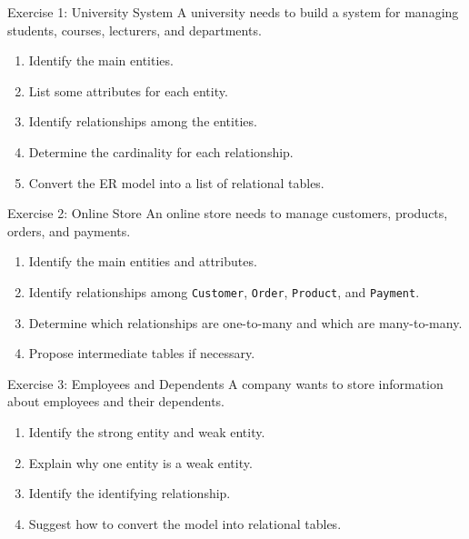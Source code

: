 \documentclass[aspectratio=169,11pt]{beamer}
\newcommand{\smallitem}{\setlength{\itemsep}{2pt}\setlength{\parskip}{0pt}}
\begin{document}
\begin{frame}{Exercise 1: University System}
\small
A university needs to build a system for managing students, courses, lecturers, and departments.

\vspace{2mm}
\begin{enumerate}
\smallitem
  \item Identify the main entities.
  \item List some attributes for each entity.
  \item Identify relationships among the entities.
  \item Determine the cardinality for each relationship.
  \item Convert the ER model into a list of relational tables.
\end{enumerate}
\end{frame}

\begin{frame}{Exercise 2: Online Store}
\small
An online store needs to manage customers, products, orders, and payments.

\vspace{2mm}
\begin{enumerate}
\smallitem
  \item Identify the main entities and attributes.
  \item Identify relationships among \texttt{Customer}, \texttt{Order}, \texttt{Product}, and \texttt{Payment}.
  \item Determine which relationships are one-to-many and which are many-to-many.
  \item Propose intermediate tables if necessary.
\end{enumerate}
\end{frame}

\begin{frame}{Exercise 3: Employees and Dependents}
\small
A company wants to store information about employees and their dependents.

\vspace{2mm}
\begin{enumerate}
\smallitem
  \item Identify the strong entity and weak entity.
  \item Explain why one entity is a weak entity.
  \item Identify the identifying relationship.
  \item Suggest how to convert the model into relational tables.
\end{enumerate}
\end{frame}
\end{document}

